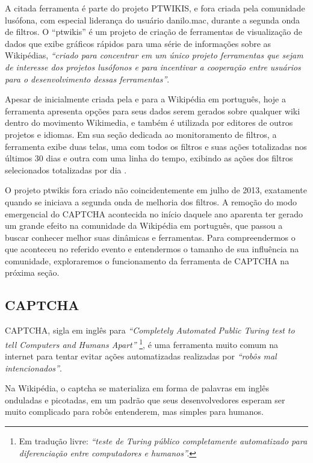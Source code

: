 
A citada ferramenta é parte do projeto PTWIKIS, e fora criada pela comunidade lusófona, com especial liderança do usuário danilo.mac, durante a segunda onda de filtros. O “ptwikis” é um projeto de criação de ferramentas de visualização de dados que exibe gráficos rápidos para uma série de informações sobre as Wikipédias, \textit{“criado para concentrar em um único projeto ferramentas que sejam de interesse dos projetos lusófonos e para incentivar a cooperação entre usuários para o desenvolvimento dessas ferramentas”}. 

Apesar de inicialmente criada pela e para a Wikipédia em português, hoje a ferramenta apresenta opções para seus dados serem gerados sobre qualquer wiki dentro do movimento Wikimedia, e também é utilizada por editores de outros projetos e idiomas. Em sua seção dedicada ao monitoramento de filtros, a ferramenta exibe duas telas, uma com todos os filtros e suas ações totalizadas nos últimos 30 dias  e  outra com uma linha do tempo, exibindo as ações dos filtros selecionados totalizadas por dia .

O projeto ptwikis fora criado não coincidentemente em julho de 2013, exatamente quando se iniciava a segunda onda de melhoria dos filtros. A remoção do modo emergencial do CAPTCHA acontecida no início daquele ano aparenta ter gerado um grande efeito na comunidade da Wikipédia em português, que passou a buscar conhecer melhor suas dinâmicas e ferramentas. Para compreendermos o que aconteceu no referido evento e entendermos o tamanho de sua influência na comunidade, exploraremos o funcionamento da ferramenta de CAPTCHA na próxima seção.

\subsection{CAPTCHA}

CAPTCHA, sigla em inglês para \textit{``Completely Automated Public Turing test to tell Computers and Humans Apart''} \footnote{Em tradução livre: \textit{“teste de Turing público completamente automatizado para diferenciação entre computadores e humanos”.}}, é uma ferramenta muito comum na internet para tentar evitar ações automatizadas realizadas por \textit{``robôs mal intencionados''}. 

Na Wikipédia, o captcha se materializa em forma de palavras em inglês onduladas e picotadas, em um padrão que seus desenvolvedores esperam ser muito complicado para robôs entenderem, mas simples para humanos. 


